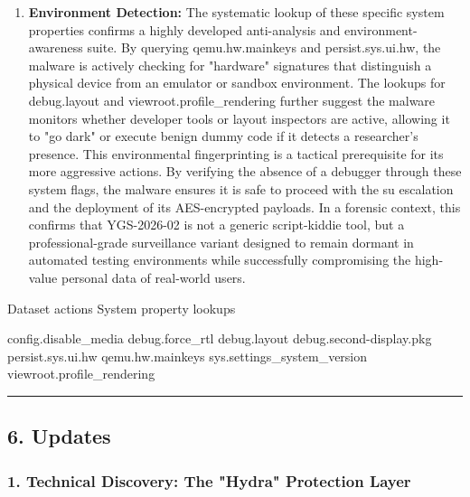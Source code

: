 \documentclass[
]{article}
\newenvironment{Shaded}{}{}
\newcommand{\NormalTok}[1]{#1}
\begin{document}
\begin{enumerate}
\def\labelenumi{\arabic{enumi}.}
\item
  \textbf{Environment Detection:} The systematic lookup of these
  specific system properties confirms a highly developed anti-analysis
  and environment-awareness suite. By querying qemu.hw.mainkeys and
  persist.sys.ui.hw, the malware is actively checking for "hardware"
  signatures that distinguish a physical device from an emulator or
  sandbox environment. The lookups for debug.layout and
  viewroot.profile\_rendering further suggest the malware monitors
  whether developer tools or layout inspectors are active, allowing it
  to "go dark" or execute benign dummy code if it detects a researcher's
  presence. This environmental fingerprinting is a tactical prerequisite
  for its more aggressive actions. By verifying the absence of a
  debugger through these system flags, the malware ensures it is safe to
  proceed with the su escalation and the deployment of its AES-encrypted
  payloads. In a forensic context, this confirms that YGS-2026-02 is not
  a generic script-kiddie tool, but a professional-grade surveillance
  variant designed to remain dormant in automated testing environments
  while successfully compromising the high-value personal data of
  real-world users.
\end{enumerate}

\begin{Shaded}
\begin{Highlighting}[]
\NormalTok{Dataset actions}
\NormalTok{System property lookups}

\NormalTok{    config.disable\_media}
\NormalTok{    debug.force\_rtl}
\NormalTok{    debug.layout}
\NormalTok{    debug.second{-}display.pkg}
\NormalTok{    persist.sys.ui.hw}
\NormalTok{    qemu.hw.mainkeys}
\NormalTok{    sys.settings\_system\_version}
\NormalTok{    viewroot.profile\_rendering}
\end{Highlighting}
\end{Shaded}

\begin{center}\rule{0.5\linewidth}{0.5pt}\end{center}

\subsection{\texorpdfstring{\textbf{6.
Updates}}{6. Updates}}\label{6-updates}

\subsubsection{1. Technical Discovery: The "Hydra" Protection
Layer}\label{1-technical-discovery-the-hydra-protection-layer}
\end{document}
